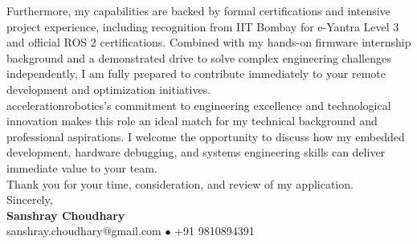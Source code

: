 \documentclass[10pt,a4paper]{article}%
\begin{document}
\noindent Furthermore, my capabilities are backed by formal certifications and intensive project experience, including recognition from IIT Bombay for e-Yantra Level 3 and official ROS 2 certifications. Combined with my hands-on firmware internship background and a demonstrated drive to solve complex engineering challenges independently, I am fully prepared to contribute immediately to your remote development and optimization initiatives. \vspace{8pt}\\

\noindent accelerationrobotics's commitment to engineering excellence and technological innovation makes this role an ideal match for my technical background and professional aspirations. I welcome the opportunity to discuss how my embedded development, hardware debugging, and systems engineering skills can deliver immediate value to your team. \vspace{8pt}\\%

\noindent Thank you for your time, consideration, and review of my application. \vspace{18pt}\\%

\noindent Sincerely, \vspace{8pt}\\%
\textbf{Sanshray Choudhary} \\%
sanshray.choudhary@gmail.com $\bullet$ +91 9810894391 \\%
\end{document}
